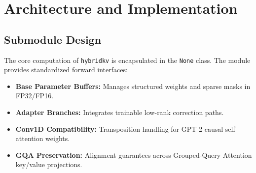 \section{Architecture and Implementation}

\subsection{Submodule Design}
The core computation of \texttt{hybridkv} is encapsulated in the \texttt{None} class. The module provides standardized forward interfaces:
\begin{itemize}
\item \textbf{Base Parameter Buffers:} Manages structured weights and sparse masks in FP32/FP16.
\item \textbf{Adapter Branches:} Integrates trainable low-rank correction paths.
\item \textbf{Conv1D Compatibility:} Transposition handling for GPT-2 causal self-attention weights.
\item \textbf{GQA Preservation:} Alignment guarantees across Grouped-Query Attention key/value projections.
\end{itemize}
